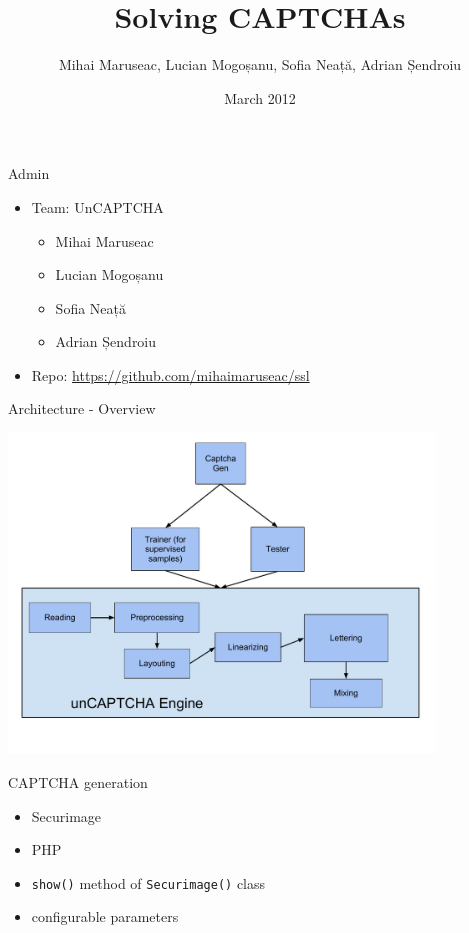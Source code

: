 \documentclass[red]{beamer}
\begin{document}
\title{Solving CAPTCHAs}
\author[MM, LM, SN, AS]{Mihai Maruseac, Lucian Mogoșanu, Sofia Neață, Adrian Șendroiu}
\date{March 2012}


\maketitle

\begin{frame}{Admin}
  \begin{itemize}
    \item Team: UnCAPTCHA
      \begin{itemize}
        \item Mihai Maruseac
        \item Lucian Mogoșanu
        \item Sofia Neață
        \item Adrian Șendroiu
      \end{itemize}
    \item Repo: \url{https://github.com/mihaimaruseac/ssl}
  \end{itemize}
\end{frame}

\begin{frame}{Architecture - Overview}
  \begin{center}
    \includegraphics[width=0.85\textwidth]{img/unCAPTCHAarchitecturedraft.pdf}
  \end{center}
\end{frame}

\begin{frame}{CAPTCHA generation}
  \begin{itemize}
    \item Securimage
    \item PHP
    \item \texttt{show()} method of \texttt{Securimage()} class
    \item configurable parameters
  \end{itemize}
\end{frame}
\end{document}
